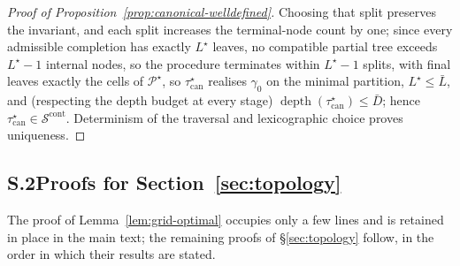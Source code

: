 \documentclass[11pt]{article}
\theoremstyle{plain}
\theoremstyle{definition}
\theoremstyle{remark}
\newcommand{\cS}{\mathcal{S}}
\newcommand{\cP}{\mathcal{P}}
\begin{document}
\begin{proof}[Proof of Proposition~\ref{prop:canonical-welldefined}]
Choosing that split preserves the invariant, and each split increases the
terminal-node count by one; since every admissible completion has exactly
\(L^\star\) leaves, no compatible partial tree exceeds \(L^\star-1\)
internal nodes, so the procedure terminates within \(L^\star-1\) splits,
with final leaves exactly the cells of \(\cP^\star\), so
\(\tau^\star_{\mathrm{can}}\) realises \(\gamma_0\) on the minimal
partition, \(L^\star\le\bar L\), and (respecting the depth budget at every
stage) \(\operatorname{depth}(\tau^\star_{\mathrm{can}})\le\bar D\); hence
\(\tau^\star_{\mathrm{can}}\in\cS^{\mathrm{cont}}\). Determinism of the
traversal and lexicographic choice proves uniqueness.
\end{proof}

\subsection*{S.2\quad Proofs for Section~\ref{sec:topology}}%
\label{sec:supp-topology}

The proof of Lemma~\ref{lem:grid-optimal} occupies only a few lines and is
retained in place in the main text; the remaining proofs of
\S\ref{sec:topology} follow, in the order in which their results are stated.
\end{document}
